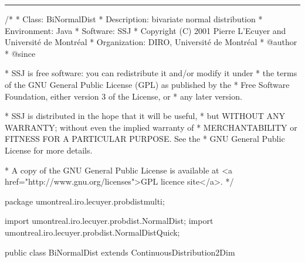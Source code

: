 \bigskip\hrule

\begin{code}
\begin{hide}
/*
 * Class:        BiNormalDist
 * Description:  bivariate normal distribution
 * Environment:  Java
 * Software:     SSJ 
 * Copyright (C) 2001  Pierre L'Ecuyer and Université de Montréal
 * Organization: DIRO, Université de Montréal
 * @author       
 * @since

 * SSJ is free software: you can redistribute it and/or modify it under
 * the terms of the GNU General Public License (GPL) as published by the
 * Free Software Foundation, either version 3 of the License, or
 * any later version.

 * SSJ is distributed in the hope that it will be useful,
 * but WITHOUT ANY WARRANTY; without even the implied warranty of
 * MERCHANTABILITY or FITNESS FOR A PARTICULAR PURPOSE.  See the
 * GNU General Public License for more details.

 * A copy of the GNU General Public License is available at
   <a href="http://www.gnu.org/licenses">GPL licence site</a>.
 */
\end{hide}
package umontreal.iro.lecuyer.probdistmulti;
\begin{hide}
import umontreal.iro.lecuyer.probdist.NormalDist;
import umontreal.iro.lecuyer.probdist.NormalDistQuick;
\end{hide}

public class BiNormalDist extends ContinuousDistribution2Dim \begin{hide} {
   protected int ndigit;        // Number of decimal digits of accuracy
   protected double mu1, mu2;
   protected double sigma1, sigma2;
   protected double rho;
   protected double racRho;        // sqrt(1 - rho^2)
   protected double detS;          // 2*PI*sigma1*sigma2*sqrt(1 - rho^2)
   protected static final double RHO_SMALL = 1.0e-8; // neglect small rhos

   private static final double Z[] = { 
      0.04691008, 0.23076534, 0.5, 0.76923466, 0.95308992 };

   private static final double W[] = {
      0.018854042, 0.038088059, 0.0452707394, 0.038088059, 0.018854042 };

   private static final double AGauss[] = {
      -0.72657601, 0.71070688, -0.142248368, 0.127414796 };

\end{hide}
\end{code}
